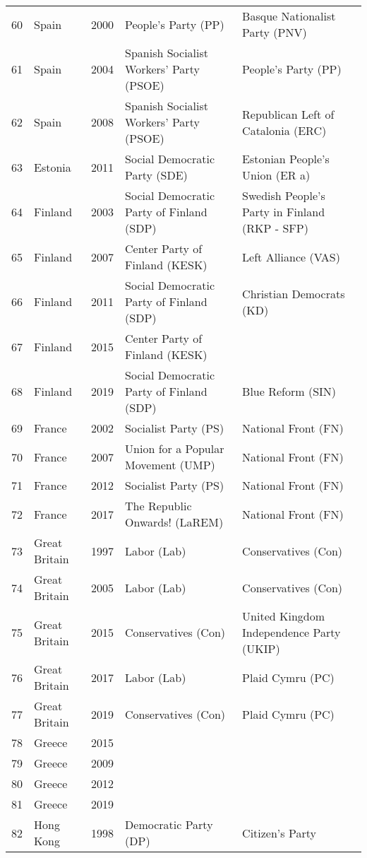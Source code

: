 \documentclass[12pt]{article}
\begin{document}
\begin{table}[ht]
\begin{footnotesize}
\begin{tabular}{rllll}
  60 & Spain & 2000 &   People's Party (PP) &   Basque Nationalist Party (PNV) \\ 
  61 & Spain & 2004 &   Spanish Socialist Workers' Party (PSOE) &   People's Party (PP) \\ 
  62 & Spain & 2008 &   Spanish Socialist Workers' Party (PSOE) &   Republican Left of Catalonia (ERC) \\ 
  63 & Estonia & 2011 &   Social Democratic Party (SDE) &   Estonian People's Union (ER a)  \\ 
  64 & Finland & 2003 &   Social Democratic Party of Finland (SDP) &   Swedish People's Party in Finland (RKP - SFP) \\ 
  65 & Finland & 2007 &   Center Party of Finland (KESK) &   Left Alliance (VAS) \\ 
  66 & Finland & 2011 &   Social Democratic Party of Finland (SDP) &   Christian Democrats (KD) \\ 
  67 & Finland & 2015 &   Center Party of Finland (KESK) &  \\ 
  68 & Finland & 2019 &   Social Democratic Party of Finland (SDP) &   Blue Reform (SIN) \\ 
  69 & France & 2002 &   Socialist Party (PS) &   National Front (FN) \\ 
  70 & France & 2007 &   Union for a Popular Movement (UMP) &   National Front (FN) \\ 
  71 & France & 2012 &   Socialist Party (PS) &   National Front (FN) \\ 
  72 & France & 2017 &   The Republic Onwards! (LaREM) &   National Front (FN) \\ 
  73 & Great Britain & 1997 &   Labor (Lab) &   Conservatives (Con) \\ 
  74 & Great Britain & 2005 &   Labor (Lab) &   Conservatives (Con) \\ 
  75 & Great Britain & 2015 &   Conservatives (Con) &   United Kingdom Independence Party (UKIP) \\ 
  76 & Great Britain & 2017 &   Labor (Lab) &   Plaid Cymru (PC)  \\ 
  77 & Great Britain & 2019 &   Conservatives (Con) &   Plaid Cymru (PC)  \\ 
  78 & Greece & 2015 &  &  \\ 
  79 & Greece & 2009 &  &  \\ 
  80 & Greece & 2012 &  &  \\ 
  81 & Greece & 2019 &  &  \\ 
  82 & Hong Kong & 1998 &   Democratic Party (DP) &   Citizen's Party \\ 

\end{tabular}
\end{footnotesize}
\end{table}
\end{document}
